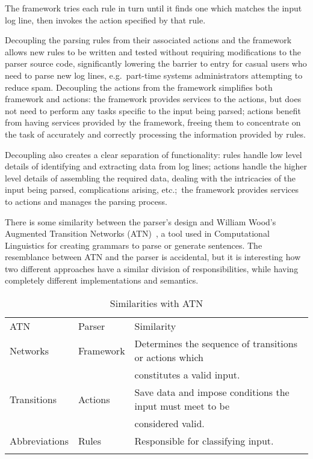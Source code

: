 \documentclass[draft]{svmult}
\begin{document}
The framework tries each rule in turn until it finds one which matches the
input log line, then invokes the action specified by that rule.

Decoupling the parsing rules from their associated actions and the
framework allows new rules to be written and tested without requiring
modifications to the parser source code, significantly lowering the barrier
to entry for casual users who need to parse new log lines, e.g.\ part-time
systems administrators attempting to reduce spam.  Decoupling the actions
from the framework simplifies both framework and actions: the framework
provides services to the actions, but does not need to perform any tasks
specific to the input being parsed; actions benefit from having services
provided by the framework, freeing them to concentrate on the task of
accurately and correctly processing the information provided by rules.

Decoupling also creates a clear separation of functionality: rules handle
low level details of identifying and extracting data from log lines;
actions handle the higher level details of assembling the required data,
dealing with the intricacies of the input being parsed, complications
arising, etc.;\ the framework provides services to actions and manages the
parsing process.

There is some similarity between the parser's design and William Wood's
Augmented Transition Networks (ATN)~\cite{atns, nlpip}, a tool used in
Computational Linguistics for creating grammars to parse or generate
sentences.  The resemblance between ATN and the parser is accidental, but
it is interesting how two different approaches have a similar division of
responsibilities, while having completely different implementations and
semantics.


\begin{table}[ht]
    \caption{Similarities with ATN}\label{Similarities with ATN}
    \begin{tabular}[]{lll}
        \hline
        \noalign{\smallskip}
        ATN           & Parser    & Similarity                          \\
        \noalign{\smallskip}
        \hline
        \noalign{\smallskip}
        Networks      & Framework & Determines the sequence of
                                    transitions or actions which        \\
                      &           & constitutes a valid input.          \\
        Transitions   & Actions   & Save data and impose conditions the
                                    input must meet to be               \\
                      &           & considered valid.                   \\
        Abbreviations & Rules     & Responsible for classifying input.  \\
        \noalign{\smallskip}
        \hline
        \noalign{\smallskip}
    \end{tabular}
\end{table}
\end{document}
